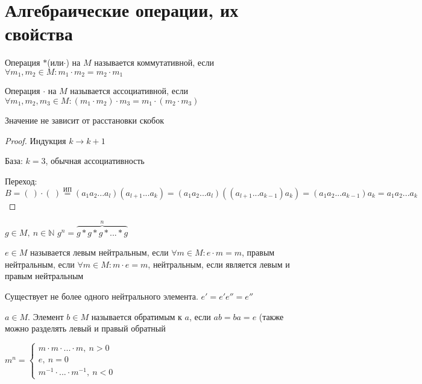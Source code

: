 
\section{Алгебраические операции, их свойства}
\begin{conj}
    Операция $*$(или$\cdot$) на $M$ называется коммутативной, если $\forall m_1, m_2 \in M : m_1\cdot m_2 = m_2\cdot m_1$
\end{conj}
\begin{conj}
    Операция $\cdot$ на $M$ называется ассоциативной, если $\forall m_1, m_2, m_3 \in M: (m_1\cdot m_2)\cdot m_3 = m_1\cdot(m_2\cdot m_3)$
\end{conj}
\begin{theorem-non}
Значение не зависит от расстановки скобок
\end{theorem-non}
\begin{proof}
Индукция $k \to k+1$

База: $k=3$, обычная ассоциативность

Переход: $B = (\ )\cdot(\ ) \overset{\text{ИП}}{=} (a_1a_2...a_l)(a_{l+1}...a_k) = (a_1a_2...a_l)((a_{l+1}...a_{k-1})a_k) = (a_1a_2...a_{k-1})a_k = a_1a_2...a_k$
\end{proof}
\begin{conj}
    $g \in M,\ n \in \mathbb{N}$ $g^n=\overbrace{g*g*g*...*g}^n$
\end{conj}

\begin{conj}
    $e \in M$ называется левым нейтральным, если $\forall m \in M: e\cdot m = m$, правым нейтральным, если $\forall m \in M: m\cdot e = m$, нейтральным, если является левым и правым нейтральным
\end{conj}
\begin{theorem-non}
    Существует не более одного нейтрального элемента. $e' = e'e'' = e''$
\end{theorem-non}
\begin{conj}
    $a \in M$. Элемент $b \in M$ называется обратимым к $a$, если $ab = ba = e$ (также можно разделять левый и правый обратный
\end{conj}
\begin{conj}
    $m^n = \begin{cases}
    m\cdot m\cdot ...\cdot m,\ n>0\\
    e,\ n=0\\
    m^{-1}\cdot ... \cdot m^{-1},\ n<0
    \end{cases}$
\end{conj}